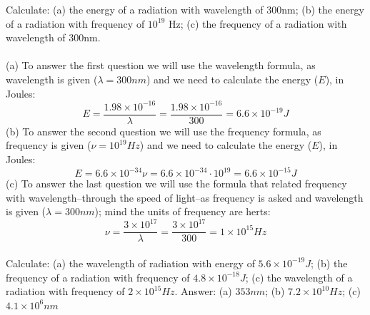 \documentclass[main.tex]{subfiles}
\begin{document}
\begin{description}
   
   
   
\begin{example} %
Calculate: (a) the energy of a radiation with wavelength of 300nm; (b) the energy of a radiation with frequency of $10^{19}$ Hz; (c) the frequency of a radiation with wavelength of 300nm.\\
\\
(a) To answer the first question we will use the wavelength formula, as wavelength is given ($\lambda=300nm$) and we need to calculate the energy ($E$), in Joules:
\begin{equation*}
E=\frac{1.98\times 10^{-16}}{\lambda}=\frac{1.98\times 10^{-16}}{300}=6.6\times 10^{-19}J
\end{equation*}
(b) To answer the second question we will use the frequency formula, as frequency is given ($\nu=10^{19}Hz$) and we need to calculate the energy ($E$), in Joules:
\begin{equation*}
E=6.6\times 10^{-34}\nu=6.6\times 10^{-34}\cdot 10^{19}=6.6\times 10^{-15}J
\end{equation*}
(c) To answer the last question we will use the formula that related frequency with wavelength--through the speed of light--as frequency is asked and wavelength is given ($\lambda=300nm$); mind the units of frequency are herts:
\begin{equation*}
\nu=\frac{3\times 10^{17}}{\lambda}=  \frac{3\times 10^{17}}{300}=1\times 10^{15}Hz
\end{equation*}
\faDiamond\ \\
Calculate: (a) the wavelength of radiation with energy of $5.6\times 10^{-19}J$; (b) the frequency of a radiation with frequency of $4.8\times 10^{-18}J$; (c) the wavelength of a radiation with frequency of $2\times 10^{15}Hz$.
\flushright Answer: (a) $353nm$; (b) $7.2\times 10^{10}Hz$; (c) $4.1\times 10^{6}nm$
\end{example}%




\end{description}
\end{document}
